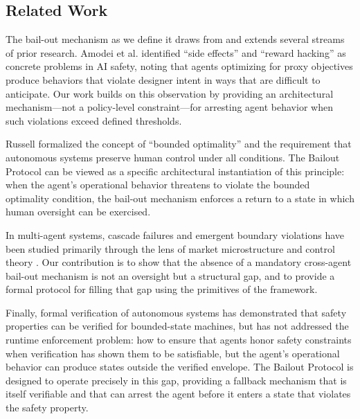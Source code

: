 \subsection{Related Work}

The bail-out mechanism as we define it draws from and extends several streams of prior research. Amodei et al. \cite{amodei2016concrete} identified ``side effects'' and ``reward hacking'' as concrete problems in AI safety, noting that agents optimizing for proxy objectives produce behaviors that violate designer intent in ways that are difficult to anticipate. Our work builds on this observation by providing an architectural mechanism—not a policy-level constraint—for arresting agent behavior when such violations exceed defined thresholds.

Russell \cite{russell2019human} formalized the concept of ``bounded optimality'' and the requirement that autonomous systems preserve human control under all conditions. The Bailout Protocol can be viewed as a specific architectural instantiation of this principle: when the agent's operational behavior threatens to violate the bounded optimality condition, the bail-out mechanism enforces a return to a state in which human oversight can be exercised.

In multi-agent systems, cascade failures and emergent boundary violations have been studied primarily through the lens of market microstructure and control theory \cite{茨维曼2012complex, filiou2022multi}. Our contribution is to show that the absence of a mandatory cross-agent bail-out mechanism is not an oversight but a structural gap, and to provide a formal protocol for filling that gap using the primitives of the \bxthree framework.

Finally, formal verification of autonomous systems \cite{DBLP:journals/corr/abs-1909-04072, filiou2022formal} has demonstrated that safety properties can be verified for bounded-state machines, but has not addressed the runtime enforcement problem: how to ensure that agents honor safety constraints when verification has shown them to be satisfiable, but the agent's operational behavior can produce states outside the verified envelope. The Bailout Protocol is designed to operate precisely in this gap, providing a fallback mechanism that is itself verifiable and that can arrest the agent before it enters a state that violates the safety property.